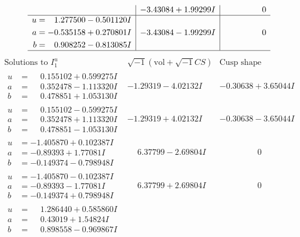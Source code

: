 \documentclass[1p]{elsarticle_modified}
\theoremstyle{definition}
\newcommand{\I}{\sqrt{-1}}
\begin{document}
$$\begin{array}{c|c|c}
 & -3.43084 + 1.99299 I & \phantom{-0.000000 } 0 \\ \hline\begin{aligned}
u &= \phantom{-}1.277500 - 0.501120 I \\
a &= -0.535158 + 0.270801 I \\
b &= \phantom{-}0.908252 - 0.813085 I\end{aligned}
 & -3.43084 - 1.99299 I & \phantom{-0.000000 } 0\\
 \hline 
 \end{array}$$\newpage$$\begin{array}{c|c|c}  
\text{Solutions to }I^u_{1}& \I (\text{vol} + \sqrt{-1}CS) & \text{Cusp shape}\\
 \hline 
\begin{aligned}
u &= \phantom{-}0.155102 + 0.599275 I \\
a &= \phantom{-}0.352478 - 1.113320 I \\
b &= \phantom{-}0.478851 + 1.053130 I\end{aligned}
 & -1.29319 - 4.02132 I & -0.30638 + 3.65044 I \\ \hline\begin{aligned}
u &= \phantom{-}0.155102 - 0.599275 I \\
a &= \phantom{-}0.352478 + 1.113320 I \\
b &= \phantom{-}0.478851 - 1.053130 I\end{aligned}
 & -1.29319 + 4.02132 I & -0.30638 - 3.65044 I \\ \hline\begin{aligned}
u &= -1.405870 + 0.102387 I \\
a &= -0.89393 + 1.77081 I \\
b &= -0.149374 - 0.798948 I\end{aligned}
 & \phantom{-}6.37799 - 2.69804 I & \phantom{-0.000000 } 0 \\ \hline\begin{aligned}
u &= -1.405870 - 0.102387 I \\
a &= -0.89393 - 1.77081 I \\
b &= -0.149374 + 0.798948 I\end{aligned}
 & \phantom{-}6.37799 + 2.69804 I & \phantom{-0.000000 } 0 \\ \hline\begin{aligned}
u &= \phantom{-}1.286440 + 0.585860 I \\
a &= \phantom{-}0.43019 + 1.54824 I \\
b &= \phantom{-}0.898558 - 0.969867 I\end{aligned}

\end{array}$$
\end{document}
